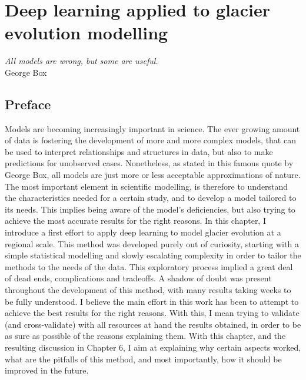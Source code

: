 \chapter{Deep learning applied to glacier evolution modelling}
\label{chap:methods}

\begin{flushright}
\begin{small}
\textit{All models are wrong, but some are useful.}\\
George Box
\end{small}
\end{flushright}

\section*{Preface}

Models are becoming increasingly important in science. The ever growing amount of data is fostering the development of more and more complex models, that can be used to interpret relationships and structures in data, but also to make predictions for unobserved cases. Nonetheless, as stated in this famous quote by George Box, all models are just more or less acceptable approximations of nature. The most important element in scientific modelling, is therefore to understand the characteristics needed for a certain study, and to develop a model tailored to its needs. This implies being aware of the model's deficiencies, but also trying to achieve the most accurate results for the right reasons. In this chapter, I introduce a first effort to apply deep learning to model glacier evolution at a regional scale. This method was developed purely out of curiosity, starting with a simple statistical modelling and slowly escalating complexity in order to tailor the methods to the needs of the data. This exploratory process implied a great deal of dead ends, complications and tradeoffs. A shadow of doubt was present throughout the development of this method, with many results taking weeks to be fully understood. I believe the main effort in this work has been to attempt to achieve the best results for the right reasons. With this, I mean trying to validate (and cross-validate) with all resources at hand the results obtained, in order to be as sure as possible of the reasons explaining them. With this chapter, and the resulting discussion in Chapter 6, I aim at explaining why certain aspects worked, what are the pitfalls of this method, and most importantly, how it should be improved in the future. 

